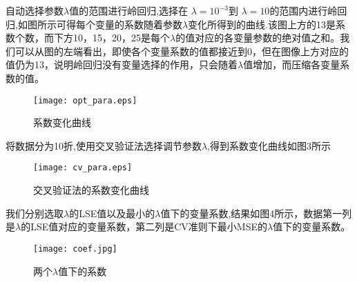 自动选择参数$\lambda$值的范围进行岭回归,选择在 $\lambda =10^{-3}$到 $\lambda = 10$的范围内进行岭回归,如图所示可得每个变量的系数随着参数$\lambda$变化所得到的曲线.该图上方的13是系数个数，而下方10，15，20，25是每个$\lambda$的值对应的各变量参数的绝对值之和。我们可以从图的左端看出，即使各个变量系数的值都接近到0，但在图像上方对应的值仍为13，说明岭回归没有变量选择的作用，只会随着$\lambda$值增加，而压缩各变量系数的值。
\begin{figure}[htbp]
  \centering
  \texttt{[image: opt\_para.eps]}
  \caption{系数变化曲线}
\end{figure}

将数据分为10折,使用交叉验证法选择调节参数$\lambda$,得到系数变化曲线如图3所示
\begin{figure}[htbp]
  \centering
  \texttt{[image: cv\_para.eps]}
  \caption{交叉验证法的系数变化曲线}
\end{figure}

我们分别选取$\lambda$的LSE值以及最小的$\lambda$值下的变量系数,结果如图4所示，数据第一列是$\lambda$的LSE值对应的变量系数，第二列是CV准则下最小MSE的$\lambda$值下的变量系数。
\begin{figure}[htbp]
  \centering
  \texttt{[image: coef.jpg]}
  \caption{两个$\lambda$值下的系数}
\end{figure}

